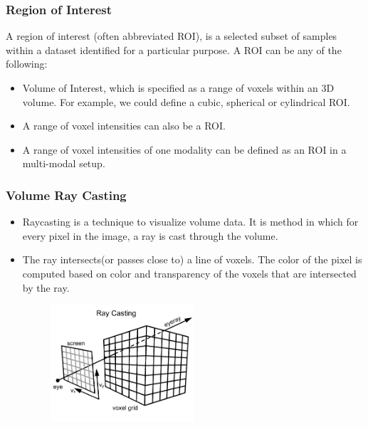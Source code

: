 \documentclass{beamer}
\begin{document}


\begin{frame}
\frametitle{Region of Interest}
A region of interest (often abbreviated ROI), is a selected subset of samples within a dataset identified for a particular purpose. A ROI can be any of the following: 
\begin{itemize}
\item Volume of Interest, which is specified as a range of voxels within an 3D volume. For example, we could define a cubic, spherical or cylindrical ROI.
\item A range of voxel intensities can also be a ROI.
\item A range of voxel intensities of one modality can be defined as an ROI in a
multi-modal setup.
\end{itemize}
\end{frame}



\begin{frame}
\frametitle{Volume Ray Casting}
\begin{itemize}
\item Raycasting is a technique to visualize volume data. It is method in which for every pixel in the image, a ray is cast through the volume. 
\item The ray intersects(or passes close to) a line of voxels. The color of the pixel is computed based on color and transparency of the voxels that are intersected by the ray.
\begin{figure}
\centering
\includegraphics[width=150pt,heigth=280pt]{ray_cast1.jpg}
\end{figure}
\end{itemize}
\end{frame}

\end{document}
